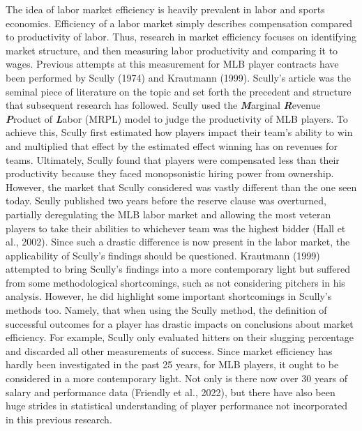 \documentclass[
  12pt,
  letterpaper,
  DIV=11,
  numbers=noendperiod]{scrartcl}
\begin{document}
The idea of labor market efficiency is heavily prevalent in labor and
sports economics. Efficiency of a labor market simply describes
compensation compared to productivity of labor. Thus, research in market
efficiency focuses on identifying market structure, and then measuring
labor productivity and comparing it to wages. Previous attempts at this
measurement for MLB player contracts have been performed by Scully
(1974) and Krautmann (1999). Scully's article was the seminal piece of
literature on the topic and set forth the precedent and structure that
subsequent research has followed. Scully used the
\textbf{\emph{M}}arginal \textbf{\emph{R}}evenue \textbf{\emph{P}}roduct
of \textbf{\emph{L}}abor (MRPL) model to judge the productivity of MLB
players. To achieve this, Scully first estimated how players impact
their team's ability to win and multiplied that effect by the estimated
effect winning has on revenues for teams. Ultimately, Scully found that
players were compensated less than their productivity because they faced
monopsonistic hiring power from ownership. However, the market that
Scully considered was vastly different than the one seen today. Scully
published two years before the reserve clause was overturned, partially
deregulating the MLB labor market and allowing the most veteran players
to take their abilities to whichever team was the highest bidder (Hall
et al., 2002). Since such a drastic difference is now present in the
labor market, the applicability of Scully's findings should be
questioned. Krautmann (1999) attempted to bring Scully's findings into a
more contemporary light but suffered from some methodological
shortcomings, such as not considering pitchers in his analysis. However,
he did highlight some important shortcomings in Scully's methods too.
Namely, that when using the Scully method, the definition of successful
outcomes for a player has drastic impacts on conclusions about market
efficiency. For example, Scully only evaluated hitters on their slugging
percentage and discarded all other measurements of success. Since market
efficiency has hardly been investigated in the past 25 years, for MLB
players, it ought to be considered in a more contemporary light. Not
only is there now over 30 years of salary and performance data (Friendly
et al., 2022), but there have also been huge strides in statistical
understanding of player performance not incorporated in this previous
research.
\end{document}
